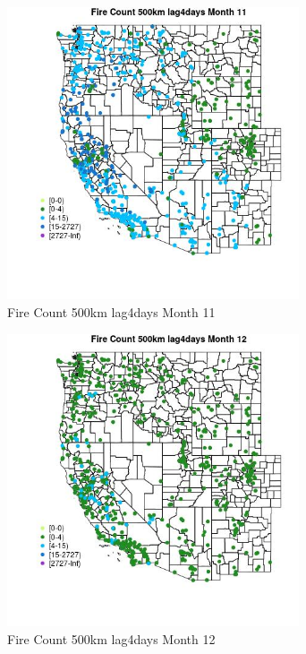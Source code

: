 \begin{figure} 
\centering  
\includegraphics[width=0.77\textwidth]{Code_Outputs/Report_ML_input_PM25_Step4_part_f_de_duplicated_aveswNAs_MapObsMo11Fire_Count_500km_lag4days.jpg} 
\caption{\label{fig:Report_ML_input_PM25_Step4_part_f_de_duplicated_aveswNAsMapObsMo11Fire_Count_500km_lag4days}Fire Count 500km lag4days Month 11} 
\end{figure} 
 

\begin{figure} 
\centering  
\includegraphics[width=0.77\textwidth]{Code_Outputs/Report_ML_input_PM25_Step4_part_f_de_duplicated_aveswNAs_MapObsMo12Fire_Count_500km_lag4days.jpg} 
\caption{\label{fig:Report_ML_input_PM25_Step4_part_f_de_duplicated_aveswNAsMapObsMo12Fire_Count_500km_lag4days}Fire Count 500km lag4days Month 12} 
\end{figure} 
 

